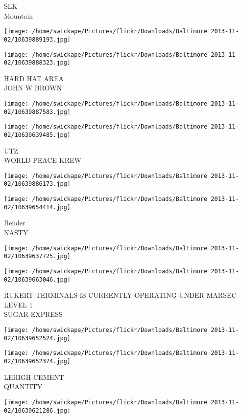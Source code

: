 \documentclass[10pt,letterpaper]{article}
\begin{document}
SLK\\
Mountain
\pagebreak

\texttt{[image: /home/swickape/Pictures/flickr/Downloads/Baltimore 2013-11-02/10639889193.jpg]}

\vspace{0.25in}
\texttt{[image: /home/swickape/Pictures/flickr/Downloads/Baltimore 2013-11-02/10639888323.jpg]}

HARD HAT AREA\\
JOHN W BROWN
\pagebreak

\texttt{[image: /home/swickape/Pictures/flickr/Downloads/Baltimore 2013-11-02/10639887583.jpg]}

\vspace{0.25in}
\texttt{[image: /home/swickape/Pictures/flickr/Downloads/Baltimore 2013-11-02/10639639485.jpg]}

UTZ\\
WORLD PEACE KREW
\pagebreak

\texttt{[image: /home/swickape/Pictures/flickr/Downloads/Baltimore 2013-11-02/10639886173.jpg]}

\vspace{0.25in}
\texttt{[image: /home/swickape/Pictures/flickr/Downloads/Baltimore 2013-11-02/10639654414.jpg]}

Bender\\
NASTY
\pagebreak

\texttt{[image: /home/swickape/Pictures/flickr/Downloads/Baltimore 2013-11-02/10639637725.jpg]}

\vspace{0.25in}
\texttt{[image: /home/swickape/Pictures/flickr/Downloads/Baltimore 2013-11-02/10639663046.jpg]}

RUKERT TERMINALS IS CURRENTLY OPERATING UNDER MARSEC LEVEL 1\\
SUGAR EXPRESS
\pagebreak

\texttt{[image: /home/swickape/Pictures/flickr/Downloads/Baltimore 2013-11-02/10639652524.jpg]}

\vspace{0.25in}
\texttt{[image: /home/swickape/Pictures/flickr/Downloads/Baltimore 2013-11-02/10639652374.jpg]}

LEHIGH CEMENT\\
QUANTITY
\pagebreak

\texttt{[image: /home/swickape/Pictures/flickr/Downloads/Baltimore 2013-11-02/10639621286.jpg]}
\end{document}
